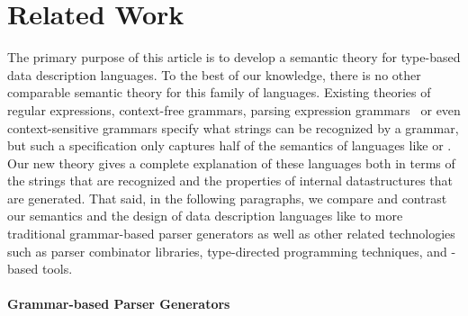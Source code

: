\section{Related Work}
\label{sec:related}

The primary purpose of this article is to develop a semantic theory
for type-based data description languages.  To the best of our
knowledge, there is no other comparable semantic theory for this
family of languages.  Existing theories of regular expressions,
context-free grammars, parsing expression
grammars~\cite{birman+:parsing,ford:pegs,ford:packrat,grimm:packrat}
or even context-sensitive grammars specify what strings can be
recognized by a grammar, but such a specification only captures half
of the semantics of languages like \pads{} or \packettypes{}.  Our new
theory gives a complete explanation of these languages both in terms
of the strings that are recognized and the properties of internal
datastructures that are generated.  That said, in the following
paragraphs, we compare and contrast our semantics and the design
of data description languages like \pads{} to more
traditional
grammar-based parser generators as well as other related technologies
such as parser combinator libraries, 
type-directed programming techniques, and \xml{}-based tools.


\paragraph*{Grammar-based Parser Generators}

